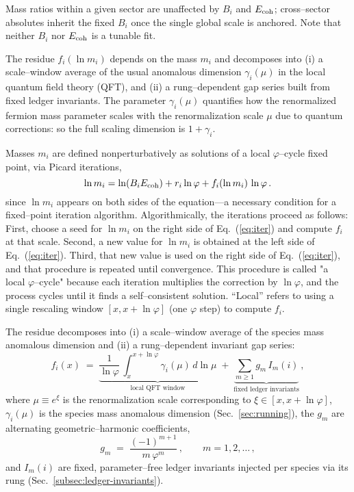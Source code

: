 \documentclass[%
  amsmath,amssymb,
  aps,
 prb,
 floatfix, showkeys
 ]{revtex4-2}
\begin{document}
 Mass ratios within a given sector are unaffected by $B_i$ and $E_{\rm coh}$; cross–sector absolutes
 inherit the fixed $B_i$ once the single global scale is anchored.
 Note that neither $B_i$ nor $E_{\rm coh}$ is a tunable fit.
 
 The residue  $f_i(\ln m_i)$ depends on the mass $m_i$ and decomposes into
 (i)  a scale–window average of the usual anomalous dimension $\gamma_i(\mu)$ in the
      local quantum field theory (QFT), and
 (ii) a rung–dependent gap series built from fixed ledger invariants.
   The parameter  $\gamma_i(\mu)$ quantifies how the renormalized fermion mass parameter scales with the
 renormalization scale $\mu$ due to quantum corrections: so the full scaling dimension is $1 + \gamma_i$.
 
 Masses $m_i$ are defined nonperturbatively as solutions of a
 local $\varphi$–cycle fixed point, via Picard iterations, 
 \begin{equation}
   \ln m_i = \ln(B_iE_{\rm coh}) + r_i\ln\varphi + f_i(\ln m_i)\,\ln\varphi\,.
 \label{eq:iter}
 \end{equation}
 since $\ln m_i$ appears on both sides of the equation—a necessary condition for a
 fixed–point iteration algorithm. Algorithmically, the iterations proceed as follows:
 First, choose a seed for  $\ln m_i$ on the right side of Eq.~(\ref{eq:iter}) and  compute $f_i$ at that scale. Second,
 a new value for $\ln m_i$ is obtained at the left side of Eq.~(\ref{eq:iter}). Third,
 that new value is used on the right side of Eq.~(\ref{eq:iter}), and that procedure is
 repeated until convergence. This procedure is called "a local $\varphi$–cycle"
 because each iteration multiplies the correction by
     $\ln \varphi$, and the process cycles until it finds a self–consistent solution. 
 “Local” refers to using a single rescaling window $[x, x+\ln \varphi]$ (one $\varphi$ step)
 to compute $f_i$.
 
 The residue decomposes into (i) a scale–window average of the species mass anomalous dimension and
 (ii) a rung–dependent invariant gap series:
 \begin{equation}
   f_i(x) \;=\; \underbrace{\frac{1}{\ln\varphi}\,\int_{x}^{x+\ln\varphi}\!\gamma_i(\mu)\,d\ln\mu}_{\text{local QFT window}}
   \;+\; \underbrace{\sum_{m\ge 1} g_m\,I_m(i)}_{\text{fixed ledger invariants}}\,,
   \label{eq:residue_local}
 \end{equation}
 where $\mu \equiv e^{\xi}$ is the renormalization scale corresponding to $\xi\in[x,x+\ln\varphi]$,
 $\gamma_i(\mu)$ is the species mass anomalous dimension (Sec.~\ref{sec:running}),
 the $g_m$ are alternating geometric–harmonic coefficients,
 \begin{equation}
   g_m \;=\; \frac{(-1)^{m+1}}{m\,\varphi^{m}}\,, \qquad m=1,2,\dots\,,
   \label{eq:gap_coeffs}
 \end{equation}
 and $I_m(i)$ are fixed, parameter–free ledger invariants injected per species via its rung (Sec.~\ref{subsec:ledger-invariants}).
 
\end{document}
